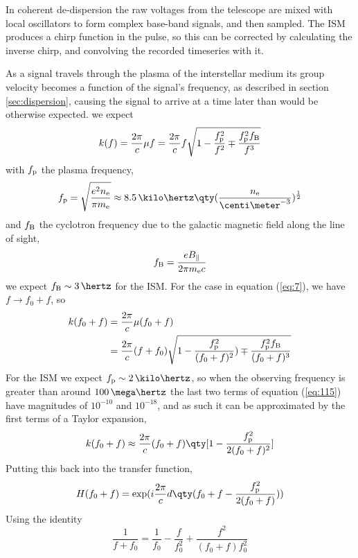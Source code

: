 In coherent de-dispersion the raw voltages from the telescope are
mixed with local oscillators to form complex base-band signals, and
then sampled. The ISM produces a chirp function in the pulse, so this
can be corrected by calculating the inverse chirp, and convolving the
recorded timeseries with it. 

As a signal travels through the plasma of the interstellar medium its
group velocity becomes a function of the signal's frequency, as
described in section \ref{sec:dispersion}, causing the signal to
arrive at a time later than would be otherwise expected. we expect
\cite[p.~87]{2004hpa..book.....L}
\begin{equation}
  \label{eq:116}
  k(f) = \frac{2 \pi}{c} \mu f = \frac{2 \pi}{c} f \sqrt{1 - \frac{f_{\rm p}^2}{f^2} \mp \frac{f_{\rm p}^2 f_{\rm B}}{f^3}}
\end{equation}
with $f_{\rm p}$ the plasma frequency,
\[ f_{\rm p} = \sqrt{\frac{e^2 n_{\rm e}}{\pi m_{\rm e}}} \approx 8.5\,
\kilo\hertz \qty( \frac{n_{\rm e}}{\centi\meter^{-3}})^{\frac{1}{2}}\]
and $f_{\rm B}$ the cyclotron frequency due to the galactic magnetic
field along the line of sight,
\[ f_{\rm B} = \frac{eB_{\parallel}}{2 \pi m_{\rm e} c} \] we expect
$f_{\rm B} \sim 3\, \hertz$ for the ISM.  For the case in equation
(\ref{eq:7}), we have $f \to f_0 + f$, so
\begin{align}
\label{eq:115}
    k(f_0 + f) &= \frac{2 \pi}{c} \mu (f_0 +f) \\ 
\label{eq:117}
&= \frac{2 \pi}{c} (f+f_0) \sqrt{1 - \frac{f_{\rm p}^2}{(f_0+f)^2}) \mp \frac{f_{\rm p}^2 f_{\rm B}}{(f_0+f)^3}}
\end{align}
For the ISM we expect $f_{\rm p} \sim 2\, \kilo\hertz$, so when the
observing frequency is greater than around $100\, \mega\hertz$ the last
two terms of equation (\ref{eq:115}) have magnitudes of $10^{-10}$ and
$10^{-18}$, and as such it can be approximated by the first terms of a
Taylor expansion,
\begin{equation}
  \label{eq:118}
  k(f_0+f) \approx \frac{2 \pi}{c} (f_0 + f) \qty[ 1 - \frac{f_{\rm p}^2}{2(f_0+f)^2}]
\end{equation}
Putting this back into the transfer function,
\begin{equation}
  \label{eq:119}
  H(f_0 + f) = \exp(i \frac{2 \pi}{c} d \qty(f_0 + f - \frac{f_{\rm p}^2}{2(f_0+f)}) )
\end{equation}
Using the identity
\begin{equation}
  \label{eq:120}
  \frac{1}{f+f_0} = \frac{1}{f_0} - \frac{f}{f_0^2} + \frac{f^2}{(f_0+f)f_0^2}
\end{equation}
